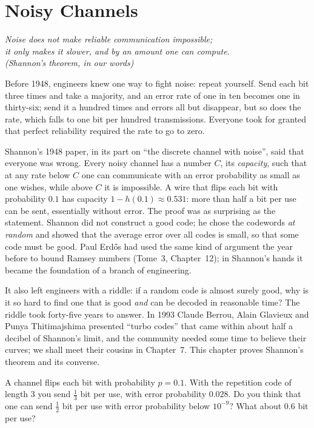 \chapter{Noisy Channels}\label{ch:channels}

\begin{center}\itshape
Noise does not make reliable communication impossible;\\
it only makes it slower, and by an amount one can compute.\\
\upshape(Shannon's theorem, in our words)
\end{center}

Before 1948, engineers knew one way to fight noise: repeat yourself. Send each bit three times and take a majority, and an error rate of one in ten becomes one in thirty-six; send it a hundred times and errors all but disappear, but so does the rate, which falls to one bit per hundred transmissions. Everyone took for granted that perfect reliability required the rate to go to zero.

Shannon's 1948 paper, in its part on ``the discrete channel with noise'', said that everyone was wrong. Every noisy channel has a number $C$, its \emph{capacity}, such that at any rate below $C$ one can communicate with an error probability as small as one wishes, while above $C$ it is impossible. A wire that flips each bit with probability $0.1$ has capacity $1-h(0.1)\approx0.531$: more than half a bit per use can be sent, essentially without error. The proof was as surprising as the statement. Shannon did not construct a good code; he chose the codewords \emph{at random} and showed that the average error over all codes is small, so that some code must be good. Paul Erd\H{o}s had used the same kind of argument the year before to bound Ramsey numbers (Tome~3, Chapter~12); in Shannon's hands it became the foundation of a branch of engineering.

It also left engineers with a riddle: if a random code is almost surely good, why is it so hard to find one that is good \emph{and} can be decoded in reasonable time? The riddle took forty-five years to answer. In 1993 Claude Berrou, Alain Glavieux and Punya Thitimajshima presented ``turbo codes'' that came within about half a decibel of Shannon's limit, and the community needed some time to believe their curves; we shall meet their cousins in Chapter~7. This chapter proves Shannon's theorem and its converse.

\begin{think}
A channel flips each bit with probability $p=0.1$. With the repetition code of length $3$ you send $\frac13$ bit per use, with error probability $0.028$. Do you think that one can send $\frac12$ bit per use with error probability below $10^{-9}$? What about $0.6$ bit per use?
\end{think}

